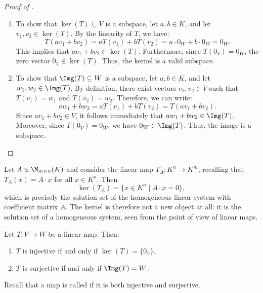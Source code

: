 \begin{proof}[Proof of ]
\begin{enumerate}[label=\textbf{(\alph*)}]
    \item To show that $\ker(T) \subseteq V$ is a subspace, let $a, b \in K$, and let $v_1, v_2 \in \ker(T)$. By the linearity of $T$, we have:
    \[
    T(a v_1 + b v_2) = a T(v_1) + b T(v_2) = a \cdot 0_W + b \cdot 0_W = 0_W.
    \]
    This implies that $a v_1 + b v_2 \in \ker(T)$. Furthermore, since $T(0_V) = 0_W$, the zero vector $0_V \in \ker(T)$. Thus, the kernel is a valid subspace.
    
    \item To show that $\Img(T) \subseteq W$ is a subspace, let $a, b \in K$, and let $w_1, w_2 \in \Img(T)$. By definition, there exist vectors $v_1, v_2 \in V$ such that $T(v_1) = w_1$ and $T(v_2) = w_2$. Therefore, we can write:
    \[
    a w_1 + b w_2 = a T(v_1) + b T(v_2) = T(a v_1 + b v_2).
    \]
    Since $a v_1 + b v_2 \in V$, it follows immediately that $a w_1 + b w_2 \in \Img(T)$. Moreover, since $T(0_V) = 0_W$, we have $0_W \in \Img(T)$. Thus, the image is a subspace.
\end{enumerate}
\end{proof}

\begin{example}
\label{ex:kernel_of_T_A}
Let $A \in \M_{m \times n}(K)$ and consider the linear map $T_A: K^n \to K^m$, recalling that $T_A(x) = A \cdot x$ for all $x \in K^n$. Then
\[
\ker(T_A) = \{x \in K^n \mid A \cdot x = 0\},
\]
which is precisely the solution set of the homogeneous linear system with coefficient matrix $A$. The kernel is therefore not a new object at all: it is the solution set of a homogeneous system, seen from the point of view of linear maps.
\end{example}

\begin{proposition}
\label{prop:injectivity_kernel}
Let $T: V \to W$ be a linear map. Then:
\begin{enumerate}[label=\textbf{(\alph*)}]
    \item $T$ is injective if and only if $\ker(T) = \{0_V\}$.
    \item $T$ is surjective if and only if $\Img(T) = W$.
\end{enumerate}
Recall that a map is called  if it is both injective and surjective.
\end{proposition}

